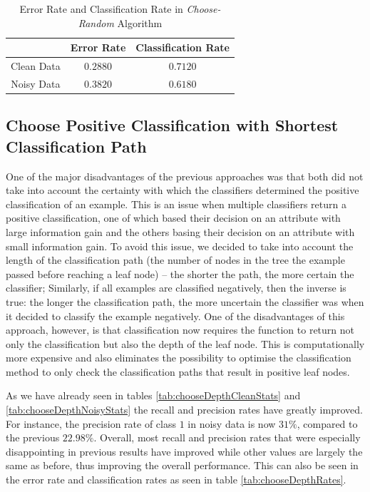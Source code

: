 \documentclass[11pt,a4paper]{article}
\begin{document}
\begin{table}[!ht]
\centering
\begin{tabular}{|c|c|c|}
\hline 
 & \textbf{Error Rate} & \textbf{Classification Rate} \\ 
\hline 
Clean Data & $0.2880$ & $0.7120$ \\ 
\hline 
Noisy Data & $0.3820$ & $0.6180$ \\ 
\hline 
\end{tabular} 
\caption{Error Rate and Classification Rate in \emph{Choose-Random} Algorithm}
\label{tab:chooseRandomRates}
\end{table}

\subsection{Choose Positive Classification with Shortest Classification Path}
One of the major disadvantages of the previous approaches was that both did not take into account the certainty with which the classifiers determined the positive classification of an example. This is an issue when multiple classifiers return a positive classification, one of which based their decision on an attribute with large information gain and the others basing their decision on an attribute with small information gain. To avoid this issue, we decided to take into account the length of the classification path (the number of nodes in the tree the example passed before reaching a leaf node) -- the shorter the path, the more certain the classifier; Similarly, if all examples are classified negatively, then the inverse is true: the longer the classification path, the more uncertain the classifier was when it decided to classify the example negatively. One of the disadvantages of this approach, however, is that classification now requires the function to return not only the classification but also the depth of the leaf node. This is computationally more expensive and also eliminates the possibility to optimise the classification method to only check the classification paths that result in positive leaf nodes. 

As we have already seen in tables \ref{tab:chooseDepthCleanStats} and \ref{tab:chooseDepthNoisyStats} the recall and precision rates have greatly improved. For instance, the precision rate of class $1$ in noisy data is now $31\%$, compared to the previous $22.98\%$. Overall, most recall and precision rates that were especially disappointing in previous results have improved while other values are largely the same as before, thus improving the overall performance. This can also be seen in the error rate and classification rates as seen in table \ref{tab:chooseDepthRates}.
\end{document}
